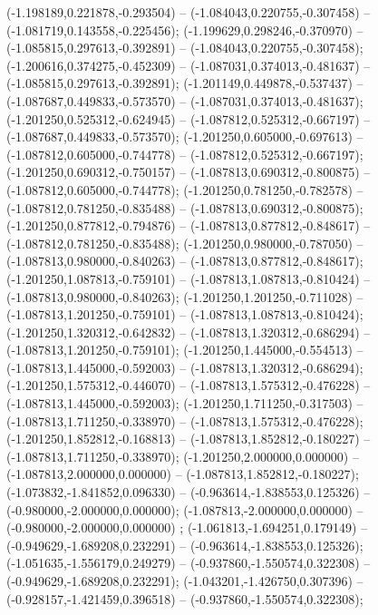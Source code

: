  (-1.198189,0.221878,-0.293504) -- (-1.084043,0.220755,-0.307458) -- (-1.081719,0.143558,-0.225456);
 (-1.199629,0.298246,-0.370970) -- (-1.085815,0.297613,-0.392891) -- (-1.084043,0.220755,-0.307458);
 (-1.200616,0.374275,-0.452309) -- (-1.087031,0.374013,-0.481637) -- (-1.085815,0.297613,-0.392891);
 (-1.201149,0.449878,-0.537437) -- (-1.087687,0.449833,-0.573570) -- (-1.087031,0.374013,-0.481637);
 (-1.201250,0.525312,-0.624945) -- (-1.087812,0.525312,-0.667197) -- (-1.087687,0.449833,-0.573570);
 (-1.201250,0.605000,-0.697613) -- (-1.087812,0.605000,-0.744778) -- (-1.087812,0.525312,-0.667197);
 (-1.201250,0.690312,-0.750157) -- (-1.087813,0.690312,-0.800875) -- (-1.087812,0.605000,-0.744778);
 (-1.201250,0.781250,-0.782578) -- (-1.087812,0.781250,-0.835488) -- (-1.087813,0.690312,-0.800875);
 (-1.201250,0.877812,-0.794876) -- (-1.087813,0.877812,-0.848617) -- (-1.087812,0.781250,-0.835488);
 (-1.201250,0.980000,-0.787050) -- (-1.087813,0.980000,-0.840263) -- (-1.087813,0.877812,-0.848617);
 (-1.201250,1.087813,-0.759101) -- (-1.087813,1.087813,-0.810424) -- (-1.087813,0.980000,-0.840263);
 (-1.201250,1.201250,-0.711028) -- (-1.087813,1.201250,-0.759101) -- (-1.087813,1.087813,-0.810424);
 (-1.201250,1.320312,-0.642832) -- (-1.087813,1.320312,-0.686294) -- (-1.087813,1.201250,-0.759101);
 (-1.201250,1.445000,-0.554513) -- (-1.087813,1.445000,-0.592003) -- (-1.087813,1.320312,-0.686294);
 (-1.201250,1.575312,-0.446070) -- (-1.087813,1.575312,-0.476228) -- (-1.087813,1.445000,-0.592003);
 (-1.201250,1.711250,-0.317503) -- (-1.087813,1.711250,-0.338970) -- (-1.087813,1.575312,-0.476228);
 (-1.201250,1.852812,-0.168813) -- (-1.087813,1.852812,-0.180227) -- (-1.087813,1.711250,-0.338970);
 (-1.201250,2.000000,0.000000) -- (-1.087813,2.000000,0.000000) -- (-1.087813,1.852812,-0.180227);
 (-1.073832,-1.841852,0.096330) -- (-0.963614,-1.838553,0.125326) -- (-0.980000,-2.000000,0.000000);
 (-1.087813,-2.000000,0.000000) -- (-0.980000,-2.000000,0.000000) ;
 (-1.061813,-1.694251,0.179149) -- (-0.949629,-1.689208,0.232291) -- (-0.963614,-1.838553,0.125326);
 (-1.051635,-1.556179,0.249279) -- (-0.937860,-1.550574,0.322308) -- (-0.949629,-1.689208,0.232291);
 (-1.043201,-1.426750,0.307396) -- (-0.928157,-1.421459,0.396518) -- (-0.937860,-1.550574,0.322308);
